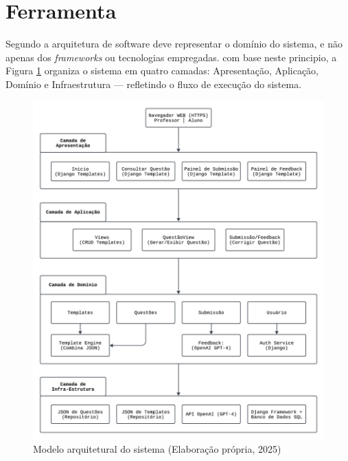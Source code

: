 \section{Ferramenta}

Segundo \parencite{martin2017} a arquitetura de software deve representar o domínio do sistema, e não apenas dos \textit{frameworks} ou tecnologias empregadas. com base neste principio, a Figura \ref{fig:modelo-arquitetural} organiza o sistema em quatro camadas: Apresentação, Aplicação, Domínio e Infraestrutura — refletindo o fluxo de execução do sistema.

\begin{figure}[ht]
	\centering
	\includegraphics[width=12cm]{./imagens/capitulo7/modelo-arquitetural}
	\caption{Modelo arquitetural do sistema (Elaboração própria, 2025) }
	\label{fig:modelo-arquitetural}
\end{figure}



